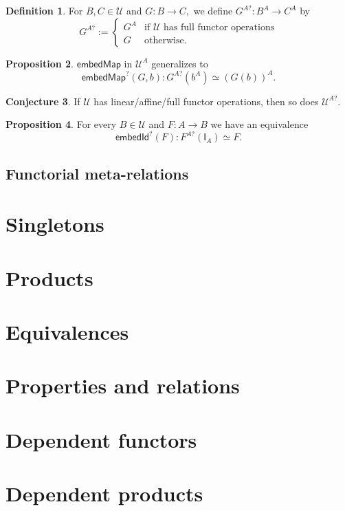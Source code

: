 \documentclass[a4paper]{article}
\theoremstyle{definition}
\newtheorem{definition}{Definition}[section]
\newtheorem{proposition}[definition]{Proposition}
\newtheorem{conjecture}[definition]{Conjecture}
\theoremstyle{remark}
\renewcommand{\equiv}{\simeq}
\newcommand{\U}{\mathcal{U}}
\newcommand{\nm}{\mathsf}
\newcommand{\combinator}{\nm}
\newcommand{\idFun}{\combinator{I}}
\begin{document}
\begin{definition}
  For $B,C \in \U$ and $G : B \to C,$ we define $G^{A?} : B^A \to C^A$ by
  \[G^{A?} := \begin{cases}
    G^A & \text{if $\U$ has full functor operations}\\
    G   & \text{otherwise.}
  \end{cases}\]
\end{definition}

\begin{proposition}
  $\nm{embedMap}$ in $\U^A$ generalizes to
  \[\nm{embedMap}^?(G,b) : G^{A?}(b^A) \equiv (G(b))^A.\]
\end{proposition}

\begin{conjecture}
  \label{conj:fun-univ-linear}
  If $\U$ has linear/affine/full functor operations, then so does $\U^{A?}.$
\end{conjecture}

\begin{proposition}
  For every $B \in \U$ and $F : A \to B$ we have an equivalence
  \[\nm{embedId}^?(F) : F^{A?}(\idFun_A) \equiv F.\]
\end{proposition}

\subsection{Functorial meta-relations}

\section{Singletons}
\label{sec:singletons}

\section{Products}
\label{sec:products}

\section{Equivalences}
\label{sec:equivalences}

\section{Properties and relations}
\label{sec:properties}
\label{sec:relations}

\section{Dependent functors}

\section{Dependent products}



\end{document}
